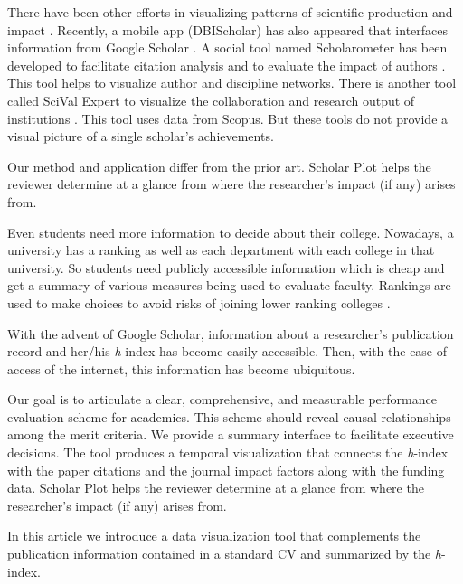 There have been other efforts in visualizing patterns of scientific production and impact \cite{Katy:2010, Chen:2001, Leydesdorff:2007}. Recently, a mobile app (DBIScholar) has also appeared that interfaces information from Google Scholar \cite{sabrina741}. A social tool named Scholarometer has been developed to facilitate citation analysis and to evaluate the impact of authors \cite{Kaur:2014}. This tool helps to visualize author and discipline networks. There is another tool called SciVal Expert to visualize the collaboration and research output of institutions \cite{Vardell:2011}. This tool uses data from Scopus. But these tools do not provide a visual picture of a single scholar's achievements.

Our method and application differ from the prior art. Scholar Plot helps the reviewer determine at a glance from where the researcher's impact (if any) arises from.%

Even students need more information to decide about their college. Nowadays, a university has a ranking as well as each department with each college in that university. So students need publicly accessible information which is cheap and get a summary of various measures being used to evaluate faculty. Rankings are used to make choices to avoid risks of joining lower ranking colleges \cite{mcdonough1998college}.

With the advent of Google Scholar, information about a researcher's publication record and her/his {\it h}-index has become easily accessible. Then, with the ease of access of the internet, this information has become ubiquitous.

Our goal is to articulate a clear, comprehensive, and measurable performance evaluation scheme for academics. This scheme should reveal causal relationships among the merit criteria. We provide a summary interface to facilitate executive decisions. The tool produces a temporal visualization that connects the {\it h}-index with the paper citations and the journal impact factors along with the funding data. Scholar Plot helps the reviewer determine at a glance from where the researcher's impact (if any) arises from.

In this article we introduce a data visualization tool that complements the publication information contained in a standard CV and summarized by the {\it h}-index.

